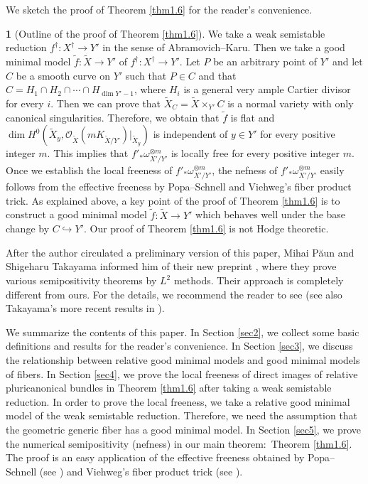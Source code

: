 \documentclass[12pt,twoside]{amsart}
\theoremstyle{definition}
\newtheorem{say}[thm]{}
\begin{document}
We sketch the proof of Theorem \ref{thm1.6} for the reader's 
convenience. 

\begin{say}[Outline of the proof of Theorem \ref{thm1.6}]
We take a weak semistable reduction 
$f^\dag: X^\dag\to Y'$ in the sense of Abramovich--Karu. 
Then we take a good minimal model $\widetilde f:\widetilde X\to Y'$ of $f^\dag: 
X^\dag\to Y'$. 
Let $P$ be an arbitrary point of $Y'$ and let $C$ be a smooth 
curve on $Y'$ such that 
$P\in C$ and that $C=H_1\cap H_2\cap  \cdots \cap H_{\dim Y'-1}$, where 
$H_i$ is a general very ample 
Cartier divisor for every $i$. 
Then we can prove that 
$\widetilde X_C=\widetilde X\times _{Y'} C$ is a normal 
variety with only canonical singularities. 
Therefore, we obtain that $\widetilde f$ is flat and $\dim H^0(\widetilde X_y, 
\mathcal O_{\widetilde X}(mK_{\widetilde X/Y'})|_{\widetilde X_y})$ is independent of 
$y\in Y'$ for every positive integer $m$. 
This implies that $f'_*\omega^{\otimes m}_{X'/Y'}$ is locally free 
for every positive integer $m$. 
Once we establish 
the local freeness of $f'_*\omega^{\otimes m}_{X'/Y'}$, 
the nefness 
of $f'_*\omega^{\otimes m}_{X'/Y'}$ easily follows from 
the effective freeness by Popa--Schnell and 
Viehweg's fiber product trick. 
As explained above, a key point of 
the proof of Theorem \ref{thm1.6} is to construct 
a good minimal model 
$\widetilde f: \widetilde X\to Y'$ which behaves well 
under the base change by $C\hookrightarrow Y'$. 
Our proof of Theorem \ref{thm1.6} is not Hodge theoretic.  
\end{say}

After the author circulated a preliminary version of 
this paper, Mihai P\u aun and Shigeharu Takayama 
informed him of their new preprint \cite{paun-takayama}, 
where they prove various semipositivity theorems by $L^2$ methods. 
Their approach is completely different from ours. 
For the details, we recommend the reader to see \cite{paun-takayama} 
(see also Takayama's more recent results in \cite{takayama}). 

We summarize the contents of this paper. 
In Section \ref{sec2}, we collect some basic definitions and 
results for the reader's convenience. 
In Section \ref{sec3}, we discuss the relationship 
between relative good minimal models and good minimal models of 
fibers. 
In Section \ref{sec4}, we prove the local freeness of 
direct images of relative 
pluricanonical bundles in Theorem \ref{thm1.6} after taking 
a weak semistable reduction. In order to prove the local freeness, 
we take a relative good minimal model of the weak semistable 
reduction. Therefore, we need the assumption that 
the geometric generic fiber has a good minimal model. 
In Section \ref{sec5}, we prove the numerical 
semipositivity (nefness) in 
our main theorem:~Theorem \ref{thm1.6}. 
The proof is an easy application of the effective freeness obtained 
by Popa--Schnell (see \cite[Theorem 1.4]{popa-schnell}) and 
Viehweg's fiber product trick (see \cite[(3.4)]{viehweg}). 
\end{document}
